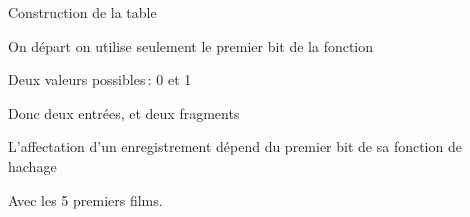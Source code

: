 \begin{frame}{Construction de la table}

On départ on utilise seulement le premier bit
de la fonction
\begin{redbullet}
  \item Deux valeurs possibles\,: 0 et 1
  \item Donc deux entrées, et deux fragments
  \item L'affectation d'un enregistrement dépend
        du premier bit de sa fonction de hachage  
\end{redbullet}

\vfill


Avec les 5 premiers films.
\end{frame}

